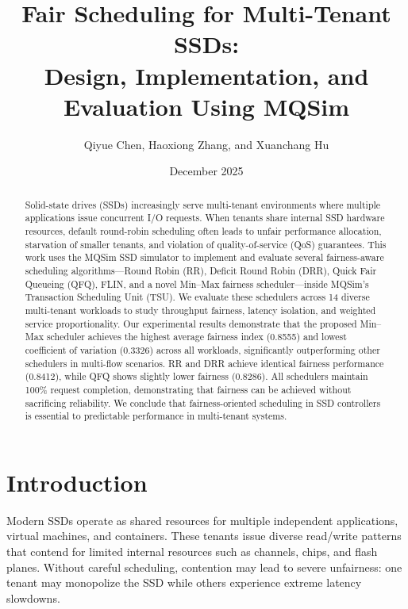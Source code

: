 \documentclass[11pt]{article}
\title{\textbf{Fair Scheduling for Multi-Tenant SSDs: \\ Design, Implementation, and Evaluation Using MQSim}}
\author{Qiyue Chen, Haoxiong Zhang, and Xuanchang Hu}
\date{December 2025}
\begin{document}
\maketitle

\begin{abstract}
Solid-state drives (SSDs) increasingly serve multi-tenant environments where 
multiple applications issue concurrent I/O requests. When tenants share internal
SSD hardware resources, default round-robin scheduling often leads to unfair
performance allocation, starvation of smaller tenants, and violation of quality-of-service (QoS) guarantees.
This work uses the MQSim SSD simulator to implement and evaluate several 
fairness-aware scheduling algorithms—Round Robin (RR), Deficit Round Robin (DRR), 
Quick Fair Queueing (QFQ), FLIN, and a novel Min--Max fairness scheduler—inside 
MQSim's Transaction Scheduling Unit (TSU). We evaluate these schedulers across 
14 diverse multi-tenant workloads to study throughput fairness, latency isolation, 
and weighted service proportionality. Our experimental results demonstrate that 
the proposed Min--Max scheduler achieves the highest average fairness index (0.8555) 
and lowest coefficient of variation (0.3326) across all workloads, significantly 
outperforming other schedulers in multi-flow scenarios. RR and DRR achieve identical 
fairness performance (0.8412), while QFQ shows slightly lower fairness (0.8286). 
All schedulers maintain 100\% request completion, demonstrating that fairness can 
be achieved without sacrificing reliability. We conclude that fairness-oriented 
scheduling in SSD controllers is essential to predictable performance in multi-tenant systems.
\end{abstract}

\section{Introduction}

Modern SSDs operate as shared resources for multiple independent applications,
virtual machines, and containers. These tenants issue diverse read/write
patterns that contend for limited internal resources such as channels, chips,
and flash planes. Without careful scheduling, contention may lead to severe 
unfairness: one tenant may monopolize the SSD while others experience extreme 
latency slowdowns.
\end{document}
